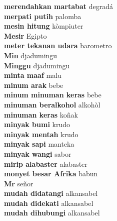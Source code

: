 \textbf{ merendahkan martabat  } degradá \\
\textbf{ merpati putih  } palomba \\
\textbf{ mesin hitung  } kòmpiuter \\
\textbf{ Mesir  } Egipto \\
\textbf{ meter tekanan udara  } barometro \\
\textbf{ Min  } djadumingu \\
\textbf{ Minggu  } djadumingu \\
\textbf{ minta maaf  } malu \\
\textbf{ minum arak  } bebe \\
\textbf{ minum minuman keras  } bebe \\
\textbf{ minuman beralkohol  } alkohòl \\
\textbf{ minuman keras  } koñak \\
\textbf{ minyak bumi  } krudo \\
\textbf{ minyak mentah  } krudo \\
\textbf{ minyak sapi  } manteka \\
\textbf{ minyak wangi  } sabor \\
\textbf{ mirip alabaster  } alabaster \\
\textbf{ monyet besar Afrika  } babun \\
\textbf{ Mr  } señor \\
\textbf{ mudah didatangi  } alkansabel \\
\textbf{ mudah didekati  } alkansabel \\
\textbf{ mudah dihubungi  } alkansabel \\
